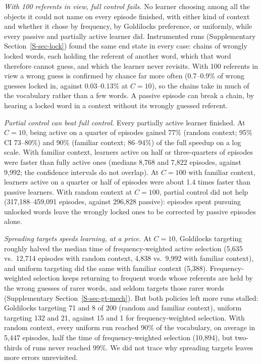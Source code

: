 \documentclass[a4paper,natbib,man]{apa6}
\begin{document}
\textit{With 100 referents in view, full control fails.} No learner choosing among all the objects it could not name on every episode finished, with either kind of context and whether it chose by frequency, by Goldilocks preference, or uniformly, while every passive and partially active learner did. Instrumented runs (Supplementary Section~\ref{S-sec-lock}) found the same end state in every case: chains of wrongly locked words, each holding the referent of another word, which that word therefore cannot guess, and which the learner never revisits. With 100 referents in view a wrong guess is confirmed by chance far more often (0.7--0.9\% of wrong guesses locked in, against 0.03--0.13\% at $C=10$), so the chains take in much of the vocabulary rather than a few words. A passive episode can break a chain, by hearing a locked word in a context without its wrongly guessed referent.

\textit{Partial control can beat full control.} Every partially active learner finished. At $C=10$, being active on a quarter of episodes gained 77\% (random context; 95\% CI 73--80\%) and 90\% (familiar context; 86--94\%) of the full speedup on a log scale. With familiar context, learners active on half or three-quarters of episodes were faster than fully active ones (medians 8,768 and 7,822 episodes, against 9,992; the confidence intervals do not overlap). At $C=100$ with familiar context, learners active on a quarter or half of episodes were about 1.4 times faster than passive learners. With random context at $C=100$, partial control did not help (317,188--459,091 episodes, against 296,828 passive): episodes spent pursuing unlocked words leave the wrongly locked ones to be corrected by passive episodes alone.

\textit{Spreading targets speeds learning, at a price.} At $C=10$, Goldilocks targeting roughly halved the median time of frequency-weighted active selection (5,635 vs.\ 12,714 episodes with random context, 4,838 vs.\ 9,992 with familiar context), and uniform targeting did the same with familiar context (5,388). Frequency-weighted selection keeps returning to frequent words whose referents are held by the wrong guesses of rarer words, and seldom targets those rarer words (Supplementary Section~\ref{S-sec-gt-mech}). But both policies left more runs stalled: Goldilocks targeting 71 and 8 of 200 (random and familiar context), uniform targeting 132 and 21, against 15 and 1 for frequency-weighted selection. With random context, every uniform run reached 90\% of the vocabulary, on average in 5,447 episodes, half the time of frequency-weighted selection (10,894), but two-thirds of runs never reached 99\%. We did not trace why spreading targets leaves more errors unrevisited.
\end{document}
